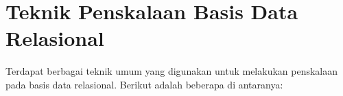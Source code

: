 \section{Teknik Penskalaan Basis Data Relasional}

Terdapat berbagai teknik umum yang digunakan untuk melakukan penskalaan pada basis data relasional. Berikut adalah beberapa di antaranya:




